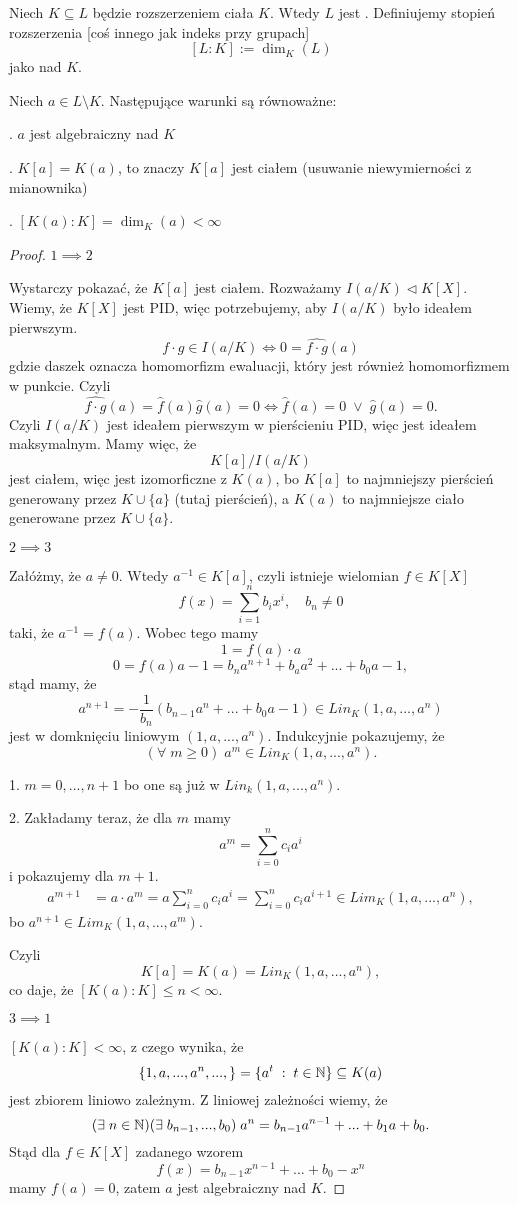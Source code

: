 Niech $K\subseteq L$ będzie rozszerzeniem ciała $K$. Wtedy $L$ jest . Definiujemy stopień rozszerzenia [coś innego jak indeks przy grupach]
$$[L:K]:=\dim_K(L)$$
jako  nad $K$.

\begin{remark}\label{uwaga:4:3}
    Niech $a\in L\setminus K$. Następujące warunki są równoważne:

. $a$ jest algebraiczny nad $K$

. $K[a]=K(a)$, to znaczy $K[a]$ jest ciałem (usuwanie niewymierności z mianownika)

. $[K(a):K]=\dim_K(a)<\infty$
\end{remark}

\begin{proof}
$1\implies2$

Wystarczy pokazać, że $K[a]$ jest ciałem. Rozważamy $I(a/K)\triangleleft K[X]$. Wiemy, że $K[X]$ jest PID, więc potrzebujemy, aby $I(a/K)$ było ideałem pierwszym.
$$f\cdot g\in I(a/K)\iff0=\hat{f\cdot g}(a)$$
gdzie daszek oznacza homomorfizm ewaluacji, który jest również homomorfizmem w punkcie. Czyli
$$\hat{f\cdot g}(a)=\hat{f}(a)\hat{g}(a)=0\iff\hat{f}(a)=0\;\lor\;\hat{g}(a)=0.$$
Czyli $I(a/K)$ jest ideałem pierwszym w pierścieniu PID, więc jest ideałem maksymalnym. Mamy więc, że
$$K[a]/I(a/K)$$
jest ciałem, więc jest izomorficzne z $K(a)$, bo $K[a]$ to najmniejszy pierścień generowany przez $K\cup\{a\}$ (tutaj pierścień), a $K(a)$ to najmniejsze ciało generowane przez $K\cup\{a\}$.

$2\implies 3$

Załóżmy, że $a\neq 0$. Wtedy $a^{-1}\in K[a]$, czyli istnieje wielomian $f\in K[X]$
$$f(x)=\sum\limits_{i=1}^n b_ix^i,\quad b_n\neq 0$$
taki, że $a^{-1}=f(a)$. Wobec tego mamy
$$1=f(a)\cdot a$$
$$0=f(a)a-1=b_na^{n+1}+b_aa^2+...+b_0a-1,$$
stąd mamy, że
$$a^{n+1}=-\frac1{b_n}(b_{n-1}a^n+...+b_0a-1)\in Lin_K(1, a, ..., a^n)$$
jest w domknięciu liniowym $(1, a,..., a^n)$. Indukcyjnie pokazujemy, że
$$(\forall\;m\geq0)\;a^m\in Lin_K(1,a,...,a^n).$$

1. $m=0,...,n+1$ bo one są już w $Lin_k(1,a,...,a^n)$.

2. Zakładamy teraz, że dla $m$ mamy 
$$a^m=\sum\limits_{i=0}^nc_ia^i$$ 
i pokazujemy dla $m+1$.
\begin{align*}
    a^{m+1}&=a\cdot a^m=a\sum\limits_{i=0}^nc_ia^{i}=\sum\limits_{i=0}^nc_ia^{i+1}\in Lim_K(1,a,...,a^n),
\end{align*}
bo $a^{n+1}\in Lim_K(1,a,...,a^m)$.

Czyli 
$$K[a]=K(a)=Lin_K(1,a,...,a^n),$$ 
co daje, że $[K(a):K]\leq n<\infty$.

$3\implies 1$

$[K(a):K]<\infty$, z czego wynika, że
$$\{1,a,...,a^n,...,\}=\{a^t\;:\;t\in\mathbb{N}\}\subseteq K(a)$$
jest zbiorem liniowo zależnym. Z liniowej zależności wiemy, że
$$(\exists\;n\in\mathbb{N})(\exists\;b_{n-1},...,b_0)\;a^{n}=b_{n-1}a^{n-1}+...+b_1a+b_0.$$
Stąd dla $f\in K[X]$ zadanego wzorem
$$f(x)=b_{n-1}x^{n-1}+...+b_0-x^n$$
mamy $f(a)=0$, zatem $a$ jest algebraiczny nad $K$.
\end{proof}

